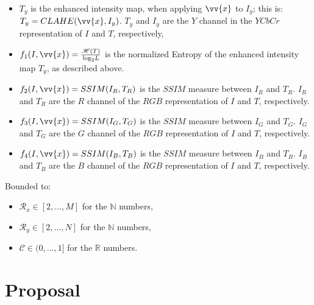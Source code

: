 \documentclass[11pt]{article}
\begin{document}
\begin{itemize}
	\item $T_y$ is the enhanced intensity map, when applying $\vv{x}$ to $I_y$; this is: $T_y=CLAHE(\vv{x},I_y)$. $T_y$ and $I_y$ are the $Y$ channel in the $YCbCr$ representation of $I$ and $T$, respectively,
	\item $f_1(I,\vv{x})=\frac{\mathscr{H}(T)}{\text{log}_2L}$ is the normalized Entropy of the enhanced intensity map $T_y$, as described above.
	\item $f_2(I,\vv{x})=SSIM(I_R,T_R)$ is the $SSIM$ measure between $I_R$ and $T_R$. $I_R$ and $T_R$ are the $R$ channel of the $RGB$ representation of $I$ and $T$, respectively.
	\item $f_3(I,\vv{x})=SSIM(I_G,T_G)$ is the $SSIM$ measure between $I_G$ and $T_G$. $I_G$ and $T_G$ are the $G$ channel of the $RGB$ representation of $I$ and $T$, respectively.
	\item $f_4(I,\vv{x})=SSIM(I_B,T_B)$ is the $SSIM$ measure between $I_B$ and $T_B$. $I_B$ and $T_B$ are the $B$ channel of the $RGB$ representation of $I$ and $T$, respectively.
\end{itemize}

Bounded to:

\begin{itemize}
\item $\mathscr{R}_x \in [2,...,M]$ for the $\mathbb{N}$ numbers,
\item $\mathscr{R}_y \in [2,...,N]$ for the $\mathbb{N}$ numbers,
\item $\mathscr{C} \in (0,...,1]$ for the $\mathbb{R}$ numbers.
\end{itemize}	

\section{Proposal}\label{sec:proposal}
\end{document}
